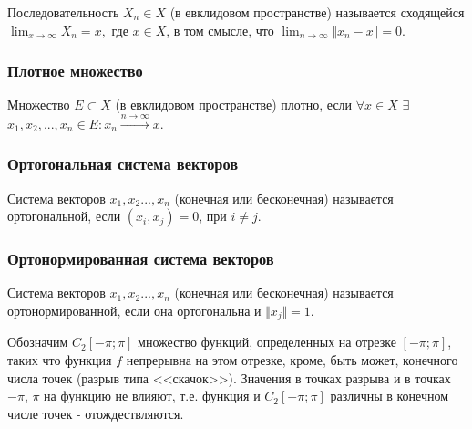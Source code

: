 \documentclass[a4paper, 12pt]{article}
\begin{document}
    Последовательность $X_n \in X$ (в евклидовом пространстве) называется сходящейся \\$\lim_{x \to \infty} X_n = x,$ где $x \in X$, в том смысле, что $\lim_{n \to \infty} \Vert x_n - x \Vert = 0$.

    \subsubsection{Плотное множество}
    Множество $E \subset X$ (в евклидовом пространстве) плотно, если $\forall x \in X$ $\exists$ $x_1, x_2, ..., x_n \in E : x_n \xrightarrow{n \to \infty} x$.

    \subsubsection{Ортогональная система векторов}
    Система векторов $x_1, x_2 ..., x_n$ (конечная или бесконечная) называется ортогональной, если $(x_i, x_j) = 0$, при $i \neq j$.

    \subsubsection{Ортонормированная система векторов}
    Система векторов $x_1, x_2 ..., x_n$ (конечная или бесконечная) называется ортонормированной, если она ортогональна и $\Vert x_j \Vert = 1$.

    Обозначим $C_2 [-\pi; \pi]$ множество функций, определенных на отрезке $[-\pi; \pi]$, таких что функция $f$ непрерывна на этом отрезке, кроме, быть может, конечного числа точек (разрыв типа <<скачок>>). Значения в точках разрыва и в точках $-\pi$, $\pi$ на функцию не влияют, т.е. функция и $C_2 [-\pi; \pi]$ различны в конечном числе точек - отождествляются.
\end{document}
